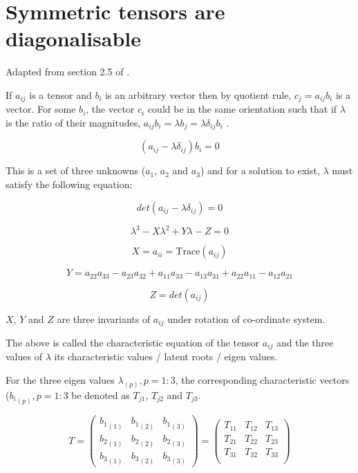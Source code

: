 \section{Symmetric tensors are diagonalisable}
\label{diagonalisable}

Adapted from section 2.5 of \cite{aris}.

If $a_{ij}$ is a tensor and $b_i$ is an arbitrary vector then by quotient rule, $c_j = a_{ij}b_i$ is a vector. For some $b_i$, the vector $c_i$ could be in the same orientation such that if $\lambda$ is the ratio of their magnitudes, $a_{ij} b_i = \lambda b_j = \lambda \delta_{ij} b_i$ . 

$$ \left( a_{ij} - \lambda \delta_{ij} \right) b_i = 0 $$

This is a set of three unknowns ($a_1$, $a_2$ and $a_3$) and for a solution to exist, $\lambda$ must satisfy the following equation:

$$ det \left( a_{ij} - \lambda \delta_{ij} \right) = 0 $$

$$ \lambda^3 - X \lambda^2 + Y \lambda - Z = 0$$

$$ X = a_{ii} = \mathrm{Trace}(a_{ij}) $$

$$ Y = a_{22}a_{33} - a_{23}a_{32} + a_{11}a_{33} - a_{13}a_{31} + a_{22}a_{11} - a_{12}a_{21} $$

$$ Z = det (a_{ij}) $$

$X$, $Y$ and $Z$ are three invariants of $a_{ij}$ under rotation of co-ordinate system.

The above is called the characteristic equation of the tensor $a_{ij}$ and the three values of $\lambda$ its characteristic values / latent roots / eigen values.

For the three eigen values $\lambda_{(p)}, p=1:3$, the corresponding characteristic vectors (${b_i}_{(p)}, p=1:3$ be denoted as $T_{j1}$, $T_{j2}$ and $T_{j3}$. 


\begin{equation}
T = \left(
\begin{array}{ccc}
{b_1}_{(1)} & {b_1}_{(2)} & {b_1}_{(3)} \\
{b_2}_{(1)} & {b_2}_{(2)} & {b_2}_{(3)} \\
{b_3}_{(1)} & {b_3}_{(2)} & {b_3}_{(3)} 
\end{array}
\right) = \left(
\begin{array}{ccc}
T_{11} & T_{12} & T_{13} \\
T_{21} & T_{22} & T_{23} \\
T_{31} & T_{32} & T_{33} \\
\end{array}
\right)
\end{equation}

